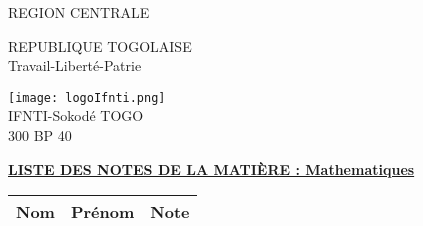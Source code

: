 \documentclass[10pt,a4paper]{article}
\begin{document}
\begin{minipage}{12cm}
\textsf{REGION CENTRALE} \\ \hspace{1cm}
\end{minipage}
\begin{minipage}{5cm}
REPUBLIQUE TOGOLAISE\\
Travail-Liberté-Patrie
\end{minipage}
\begin{minipage}{3cm}
\begin{center}
\texttt{[image: logoIfnti.png]} \\ \hspace{1cm}
IFNTI-Sokodé TOGO\\300 BP 40
\end{center}
\end{minipage}

\begin{center}
\underline{\textbf{LISTE DES NOTES DE LA MATIÈRE : Mathematiques}}
\end{center}

\begin{longtable}{|l|l|l|} \hline
\textbf{Nom} & \textbf{Prénom} & \textbf{Note} \\ \hline

\end{longtable}
\end{document}
